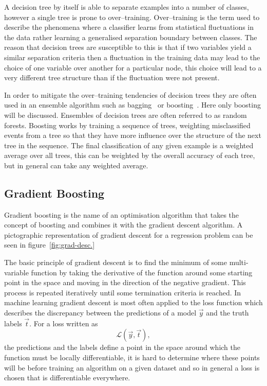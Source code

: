 A decision tree by itself is able to separate examples into a number of classes,
however a single tree is prone to over--training. Over--training is the term
used to describe the phenomena where a classifier learns from statistical
fluctuations in the data rather learning a generalised separation boundary
between classes. The reason that decision trees are susceptible to this is that
if two variables yield a similar separation criteria then a fluctuation in the
training data may lead to the choice of one variable over another for a
particular node, this choice will lead to a very different tree structure than
if the fluctuation were not present.

In order to mitigate the over--training tendencies of decision trees they are
often used in an ensemble algorithm such as bagging~\cite{bagging}
or boosting~\cite{boosting}. Here only boosting will be discussed. Ensembles of
decision trees are often referred to as random forests. Boosting works by
training a sequence of trees, weighting misclassified events from a tree so that
they have more influence over the structure of the next tree in the sequence.
The final classification of any given example is a weighted average over all
trees, this can be weighted by the overall accuracy of each tree, but in general
can take any weighted average.

\subsection{Gradient Boosting}

Gradient boosting is the name of an optimisation algorithm that takes the
concept of boosting and combines it with the gradient descent algorithm. A
pictographic representation of gradient descent for a regression problem can be
seen in figure~\ref{fig:grad-desc.}

The basic principle of gradient descent is to find the minimum of some
multi-variable function by taking the derivative of the function around some
starting point in the space and moving in the direction of the negative
gradient. This process is repeated iteratively until some termination criteria
is reached. In machine learning gradient descent is most often applied to the
loss function which describes the discrepancy between the predictions of a model
$\vec{y}$ and the truth labels $\vec{t}$. For a loss written as
\begin{equation}
  \mathcal{L}(\vec{y}, \vec{t}),
\end{equation}
the predictions and the labels define a point in the space around which the
function must be locally differentiable, it is hard to determine where these
points will be before training an algorithm on a given dataset and so in general
a loss is chosen that is differentiable everywhere.

